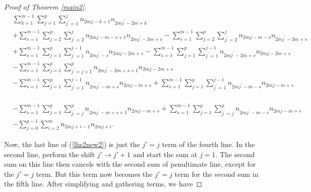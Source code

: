 \documentclass[11pt,reqno]{amsart}
\theoremstyle{definition}
\numberwithin{equation}{section}
\begin{document}
\begin{proof}[Proof of Theorem \ref{main2}]
\begin{equation*} 
\begin{aligned}
& \sum_{k=1}^{m-1} \sum_{j=1}^{p} \sum_{j^{\prime}=1}^{j} n_{2mj-k+1}n_{2mj^{\prime} - 2m + k}
\\
& + \sum_{s=1}^{m-1} \sum_{j=2}^{p} \sum_{j^{\prime}=2}^{j} n_{2mj - m - s +1}n_{2mj^{\prime} - 3m+s} - \sum_{s=1}^{m-1} \sum_{j=2}^{p} \sum_{j^{\prime}=2}^{j}n_{2mj-m-s} n_{2mj^{\prime} - 3m+s} \\
& + \sum_{s=1}^{m-1} \sum_{j=1}^{p}  \sum_{j^{\prime}=1}^{j-1} n_{2mj^{\prime} - s}n_{2mj-2m+s} - \sum_{s=1}^{m-1} \sum_{j=1}^{p}  \sum_{j^{\prime}=1}^{j-1} n_{2mj^{\prime} - 2m + s}n_{2mj-2m+s} \\ 
& - \sum_{s=1}^{m-1} \sum_{j=1}^{p}\sum_{j^{\prime}=j+1}^{p}n_{2mj^{\prime} - 2m + s + 1} n_{2mj-2m+s} \\
& - \sum_{s=1}^{m-1} \sum_{j=1}^{p} \sum_{j^{\prime}=1}^{j-1} n_{2mj^{\prime} - m + s}n_{2mj-m+s} + \sum_{s=1}^{m-1} \sum_{j=1}^{p} \sum_{j^{\prime}=1}^{j-1} n_{2mj^{\prime} - m - s}n_{2mj-m+s} \\
\end{aligned}
\end{equation*}

\begin{equation}  \label{lhs2new2}
\begin{aligned}
&- \sum_{s=1}^{m-1} \sum_{j=1}^{p} \sum_{j^{\prime}=j}^{p} n_{2mj^{\prime} - m + s + 1}n_{2mj-m+s} + \sum_{s=1}^{m-1} \sum_{j=1}^{p} \sum_{j^{\prime}=j}^{p}n_{2mj^{\prime} - m - s}n_{2mj-m+s} \\
& - \sum_{j=0}^{p-1} \sum_{i=2}^{m} n_{2mj+i-1}n_{2mj+i}.
\end{aligned}
\end{equation}

Now, the last line of (\ref{lhs2new2}) is just the $j'=j$ term of the fourth line.   In the second line, perform the shift $j' \to j'+1$ and start the sum at $j=1$. The second sum on this line then cancels with the second sum of penultimate line, except for the $j'=j$ term.  But this term now becomes the $j'=j$ term for the second sum in the fifth line. After simplifying and gathering terms, we have


\end{proof}
\end{document}
